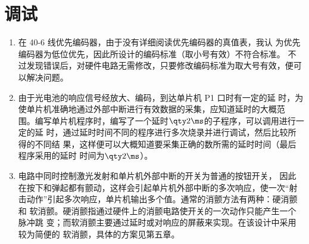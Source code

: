 \section{调试}

\begin{enumerate}
  \item 在 40-6 线优先编码器，由于没有详细阅读优先编码器的真值表，我认
  为优先编码器为低位优先，因此所设计的编码标准（取小号有效）不符合标准。
  不过发现错误后，对硬件电路无需修改，只要修改编码标准为取大号有效，便可
  以解决问题。
  \item 由于光电池的响应信号经放大、编码，到达单片机 P1 口时有一定的延
  时，为使单片机准确地通过外部中断进行有效数据的采集，应知道延时的大概范
  围。编写单片机程序时，编写了一个延时$\qty2\ms$的子程序，可以调用进行一定的延
  时，通过延时时间不同的程序进行多次烧录并进行调试，然后比较所得的不同结
  果，这样便可以大概知道要采集正确的数所需的延时时间（最后程序采用的延时
  时间为$\qty2\ms$）。
  \item 电路中同时控制激光发射和单片机外部中断的开关为普通的按钮开关，
  因此在按下和弹起都有颤动，这样会引起单片机外部中断的多次响应，使一次``射
  击动作''引起多次响应，单片机输出多个值。通常的消颤方法有两种：硬消颤和
  软消颤。硬消颤指通过硬件上的消颤电路使开关的一次动作只能产生一个脉冲跳
  变；而软消颤主要通过延时或对响应的屏蔽来实现。在该设计中采用较为简便的
  软消颤，具体的方案见第五章。
\end{enumerate}